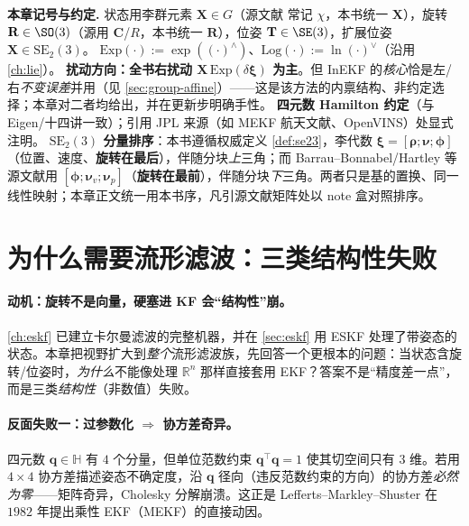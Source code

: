 \begin{note}
\textbf{本章记号与约定.}\;
状态用李群元素 $\mathbf{X}\in G$（源文献\cite{barrau2017invariant} 常记 $\chi$，本书统一 $\mathbf{X}$），旋转 $\mathbf{R}\in\SO(3)$（源用 $\mathbf{C}$/$R$，本书统一 $\mathbf{R}$），位姿 $\mathbf{T}\in\SE(3)$，扩展位姿 $\mathbf{X}\in\mathrm{SE}_2(3)$。
$\mathrm{Exp}(\cdot):=\exp((\cdot)^\wedge)$、$\mathrm{Log}(\cdot):=\ln(\cdot)^\vee$（沿用 \cref{ch:lie}）。
\textbf{扰动方向：全书右扰动 $\mathbf{X}\,\mathrm{Exp}(\delta\boldsymbol{\xi})$ 为主}。但 InEKF 的\emph{核心}恰是左/右\emph{不变误差}并用（见 \cref{sec:group-affine}）——这是该方法的内禀结构、非约定选择；本章对二者均给出，并在更新步明确手性。
\textbf{四元数 Hamilton 约定}（与 Eigen/十四讲一致）；引用 JPL 来源（如 MEKF 航天文献、OpenVINS）处显式注明。
\textbf{$\mathrm{SE}_2(3)$ 分量排序}：本书遵循权威定义 \cref{def:se23}，李代数 $\boldsymbol{\xi}=[\boldsymbol{\rho};\boldsymbol{\nu};\boldsymbol{\phi}]$（位置、速度、\textbf{旋转在最后}），伴随分块\emph{上}三角；而 Barrau--Bonnabel/Hartley 等源文献用 $[\boldsymbol{\phi};\boldsymbol{\nu}_v;\boldsymbol{\nu}_p]$（\textbf{旋转在最前}），伴随分块\emph{下}三角。两者只是基的置换、同一线性映射；本章正文统一用本书序，凡引源文献矩阵处以 note 盒对照排序。
\end{note}

\section{为什么需要流形滤波：三类结构性失败}
\label{sec:why-manifold}

\paragraph{动机：旋转不是向量，硬塞进 KF 会“结构性”崩。}
\cref{ch:eskf} 已建立卡尔曼滤波的完整机器，并在 \cref{sec:eskf} 用 ESKF 处理了带姿态的状态。本章把视野扩大到\emph{整个}流形滤波族，先回答一个更根本的问题：当状态含旋转/位姿时，\emph{为什么}不能像处理 $\mathbb{R}^n$ 那样直接套用 EKF？答案不是“精度差一点”，而是三类\emph{结构性}（非数值）失败\cite{sola2017quaternion}。

\paragraph{反面失败一：过参数化 $\Rightarrow$ 协方差奇异。}
四元数 $\mathbf{q}\in\mathbb{H}$ 有 $4$ 个分量，但单位范数约束 $\mathbf{q}^\top\mathbf{q}=1$ 使其切空间只有 $3$ 维。若用 $4\times4$ 协方差描述姿态不确定度，沿 $\mathbf{q}$ 径向（违反范数约束的方向）的协方差\emph{必然为零}——矩阵奇异，Cholesky 分解崩溃。这正是 Lefferts--Markley--Shuster 在 $1982$ 年提出乘性 EKF（MEKF）的直接动因\cite{lefferts1982kalman}。

